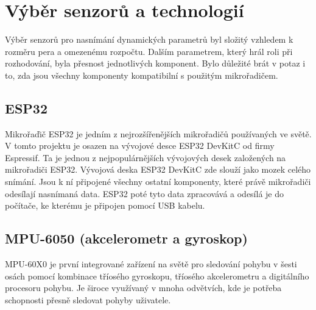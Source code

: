 

\section{Výběr senzorů a technologií}
Výběr senzorů pro nasnímání dynamických parametrů byl složitý vzhledem k rozměru pera a omezenému rozpočtu. %
Dalším parametrem, který hrál roli při rozhodování, byla přesnost jednotlivých komponent.                   %
Bylo důležité brát v potaz i to, zda jsou všechny komponenty kompatibilní s použitým mikrořadičem.          %

\subsection*{ESP32}
Mikrořaďič ESP32 je jedním z nejrozšířenějších mikrořadičů používaných ve světě.                            %
V tomto projektu je osazen na vývojové desce ESP32 DevKitC od firmy Espressif.                              %
Ta je jednou z nejpopulárnějších vývojových desek založených na mikrořadiči ESP32.                          %
Vývojová deska ESP32 DevKitC zde slouží jako mozek celého snímání.                                          %
Jsou k ní připojené všechny ostatní komponenty, které právě mikrořadiči odesílají nasnímaná data.           %
ESP32 poté tyto data zpracovává a odesílá je do počítače, ke kterému je připojen  pomocí USB kabelu.        %

\subsection*{MPU-6050 (akcelerometr a gyroskop)}
MPU-60X0 je první integrované zařízení na světě pro sledování pohybu v šesti osách pomocí           %
kombinace tříosého gyroskopu, tříosého akcelerometru a digitálního procesoru pohybu.                %
Je široce využívaný v mnoha odvětvích, kde je potřeba schopnosti přesně sledovat pohyby uživatele.  %

